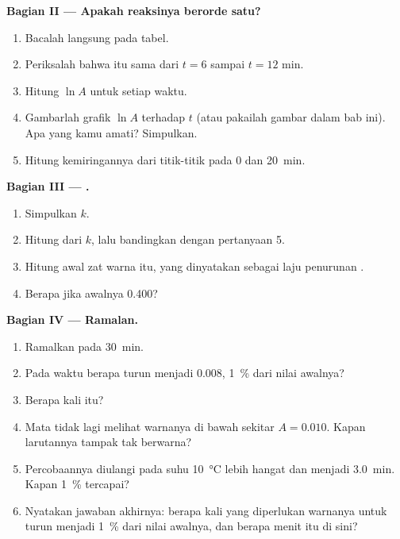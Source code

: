 \begin{problem}
\medskip
\noindent\textbf{Bagian II --- Apakah reaksinya berorde satu?}
\begin{enumerate}[resume]
  \item Bacalah  langsung pada tabel.
  \item Periksalah bahwa  itu sama dari $t = 6$ sampai
        $t = 12$ min.
  \item Hitung $\ln A$ untuk setiap waktu.
  \item Gambarlah grafik $\ln A$ terhadap $t$ (atau pakailah gambar dalam
        bab ini). Apa yang kamu amati? Simpulkan.
  \item Hitung kemiringannya dari titik-titik pada 0 dan \qty{20}{min}.
\end{enumerate}

\medskip
\noindent\textbf{Bagian III --- .}
\begin{enumerate}[resume]
  \item Simpulkan $k$.
  \item Hitung  dari $k$, lalu bandingkan dengan pertanyaan 5.
  \item Hitung  awal zat warna itu, yang dinyatakan
        sebagai laju penurunan .
  \item Berapa  jika  awalnya 0.400?
\end{enumerate}

\medskip
\noindent\textbf{Bagian IV --- Ramalan.}
\begin{enumerate}[resume]
  \item Ramalkan  pada \qty{30}{min}.
  \item Pada waktu berapa  turun menjadi 0.008,
        \qty{1}{\percent} dari nilai awalnya?
  \item Berapa kali  itu?
  \item Mata tidak lagi melihat warnanya di bawah sekitar $A = 0.010$.
        Kapan larutannya tampak tak berwarna?
  \item Percobaannya diulangi pada suhu \qty{10}{\celsius} lebih hangat
        dan  menjadi \qty{3.0}{min}. Kapan \qty{1}{\percent}
        tercapai?
  \item Nyatakan jawaban akhirnya: berapa kali  yang
        diperlukan warnanya untuk turun menjadi \qty{1}{\percent} dari
        nilai awalnya, dan berapa menit itu di sini?
\end{enumerate}
\end{problem}
